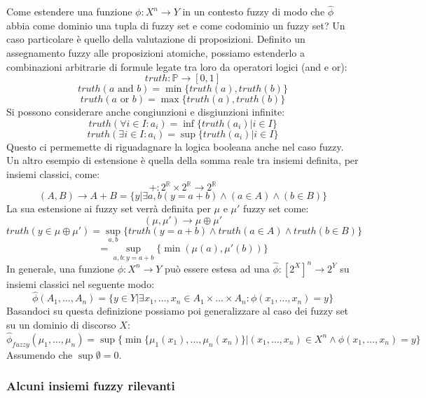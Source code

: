 \documentclass[10pt,a4paper]{article}
\begin{document}
Come estendere una funzione $\phi : X^n \to Y$ in un contesto fuzzy di modo che $\hat{\phi}$ abbia come dominio una tupla di fuzzy set e come codominio un fuzzy set? Un caso particolare è quello della valutazione di proposizioni. Definito un assegnamento fuzzy alle proposizioni atomiche, possiamo estenderlo a combinazioni arbitrarie di formule legate tra loro da operatori logici (and e or):
$$
truth: \mathbb{P} \to [0,1]
$$
$$
truth(a\text{ and }b) =  \min\{truth(a),truth(b)\}
$$
$$
truth(a\text{ or }b) =  \max\{truth(a),truth(b)\}
$$
Si possono considerare anche congiunzioni e disgiunzioni infinite:
$$
truth(\forall i \in I : a_i) = 	\inf \{ truth(a_i) | i \in I \}
$$
$$
truth(\exists i \in I : a_i) = 	\sup \{ truth(a_i) | i \in I \}
$$
Questo ci permemette di riguadagnare la logica booleana anche nel caso fuzzy. Un altro esempio di estensione è quella della somma reale tra insiemi definita, per insiemi classici, come:
$$
+ : 2^{\mathbb{R}} \times 2^{\mathbb{R}} \to 2^{\mathbb{R}}
$$
$$
(A,B) \to A + B = \{y | \exists a,b (y = a + b) \land (a \in A) \land (b \in B) \}
$$
La sua estensione ai fuzzy set verrà definita per $\mu$ e $\mu'$ fuzzy set come:
$$
(\mu,\mu') \to \mu \oplus \mu' 
$$
$$
truth(y \in \mu \oplus \mu') = \sup_{a,b}\{ truth(y = a + b) \land truth(a \in A) \land truth(b \in B)\}
$$
$$
= \sup_{a,b:y=a+b} \{ \min(\mu(a),\mu'(b)) \}
$$
In generale, una funzione $\phi : X^n \to Y$ può essere estesa ad una $\hat{\phi} : [2^X]^n \to 2^Y$ su insiemi classici nel seguente modo:
$$
\hat{\phi} (A_1, \dots, A_n) = \{ y \in Y | \exists x_1, \dots, x_n \in A_1 \times \dots \times A_n : \phi(x_1,\dots,x_n) = y \}
$$
Basandoci su questa definizione possiamo poi generalizzare al caso dei fuzzy set su un dominio di discorso $X$:
$$
\hat{\phi}_{fuzzy} (\mu_1, \dots, \mu_n) = \sup\{ \min \{ \mu_1(x_1), \dots, \mu_n(x_n) \} | (x_1, \dots, x_n) \in X^n \land \phi(x_1, \dots, x_n) = y \}
$$
Assumendo che $\sup \emptyset = 0$.

\subsubsection{Alcuni insiemi fuzzy rilevanti}
\end{document}
